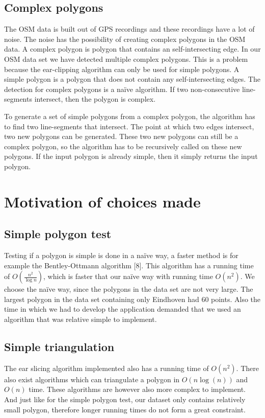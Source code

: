\subsection{Complex polygons}
The OSM data is built out of GPS recordings and these recordings have a lot of noise. The noise has the possibility of creating complex polygons in the OSM data. A complex polygon is polygon that contains an self-intersecting edge. In our OSM data set we have detected multiple complex polygons. This is a problem because the ear-clipping algorithm can only be used for simple polygons. A simple polygon is a polygon that does not contain any self-intersecting edges. The detection for complex polygons is a naïve algorithm. If two non-consecutive line-segments intersect, then the polygon is complex.

To generate a set of simple polygons from a complex polygon, the algorithm has to find two line-segments that intersect. The point at which two edges intersect, two new polygons can be generated. These two new polygons can still be a complex polygon, so the algorithm has to be recursively called on these new polygons. If the input polygon is already simple, then it simply returns the input polygon.

\section{Motivation of choices made}
\subsection{Simple polygon test}
Testing if a polygon is simple is done in a naïve way, a faster method is for example the Bentley-Ottmann algorithm [8]. This algorithm has a running time of $O(\frac{n^2}{\log{n}})$, which is faster that our naïve way with running time $O(n^2)$. We choose the naïve way, since the polygons in the data set are not very large. The largest polygon in the data set containing only Eindhoven had 60 points. Also the time in which we had to develop the application demanded that we used an algorithm that was relative simple to implement.

\subsection{Simple triangulation}
The ear slicing algorithm implemented also has a running time of $O(n^2)$. There also exist algorithms which can triangulate a polygon in $O(n\log(n))$ and $O(n)$ time. These algorithms are however also more complex to implement. And just like for the simple polygon test, our dataset only contains relatively small polygon, therefore longer running times do not form a great constraint.
